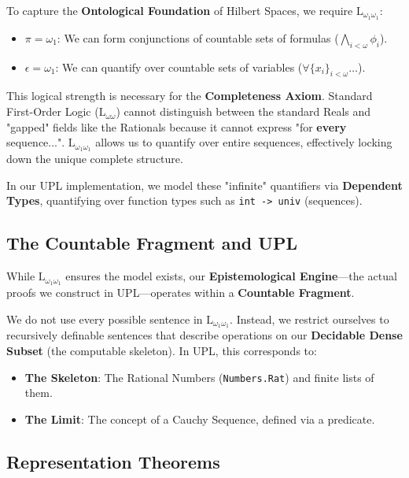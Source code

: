 \documentclass{stex}
\begin{document}
To capture the \textbf{Ontological Foundation} of Hilbert Spaces, we require $\mathrm{L}_{\omega_1 \omega_1}$:
\begin{itemize}
    \item $\pi = \omega_1$: We can form conjunctions of countable sets of formulas ($\bigwedge_{i < \omega} \phi_i$). 
    \item $\epsilon = \omega_1$: We can quantify over countable sets of variables ($\forall \{x_i\}_{i < \omega} \dots$).
\end{itemize}

This logical strength is necessary for the \textbf{Completeness Axiom}. Standard First-Order Logic ($\mathrm{L}_{\omega \omega}$) cannot distinguish between the standard Reals and "gapped" fields like the Rationals because it cannot express "for \textbf{every} sequence...". $\mathrm{L}_{\omega_1 \omega_1}$ allows us to quantify over entire sequences, effectively locking down the unique complete structure.

In our UPL implementation, we model these "infinite" quantifiers via \textbf{Dependent Types}, quantifying over function types such as \texttt{int -> univ} (sequences).

\subsection{The Countable Fragment and UPL}

While $\mathrm{L}_{\omega_1 \omega_1}$ ensures the model exists, our \textbf{Epistemological Engine}---the actual proofs we construct in UPL---operates within a \textbf{Countable Fragment}. 

We do not use every possible sentence in $\mathrm{L}_{\omega_1 \omega_1}$. Instead, we restrict ourselves to recursively definable sentences that describe operations on our \textbf{Decidable Dense Subset} (the computable skeleton).
In UPL, this corresponds to:
\begin{itemize}
    \item \textbf{The Skeleton}: The Rational Numbers (\texttt{Numbers.Rat}) and finite lists of them.
    \item \textbf{The Limit}: The concept of a Cauchy Sequence, defined via a predicate.
\end{itemize}

\subsection{Representation Theorems}
\end{document}

